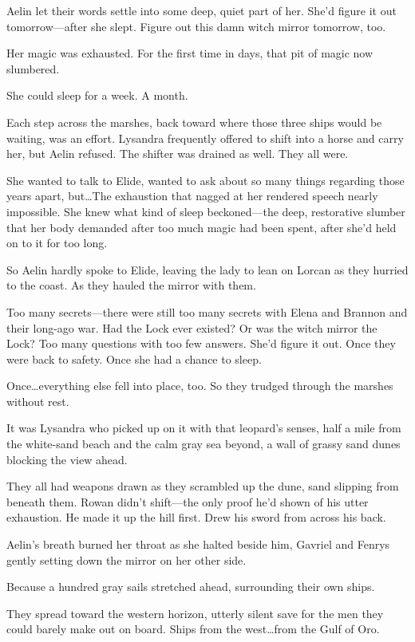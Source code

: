 Aelin let their words settle into some deep, quiet part of her.
She'd figure it out tomorrow---after she slept.
Figure out this damn witch mirror tomorrow, too.

Her magic was exhausted.
For the first time in days, that pit of magic now slumbered.

She could sleep for a week.
A month.

Each step across the marshes, back toward where those three ships would be waiting, was an effort.
Lysandra frequently offered to shift into a horse and carry her, but Aelin refused.
The shifter was drained as well.
They all were.

She wanted to talk to Elide, wanted to ask about so many things regarding those years apart, but\ldots The exhaustion that nagged at her rendered speech nearly impossible.
She knew what kind of sleep beckoned---the deep, restorative slumber that her body demanded after too much magic had been spent, after she'd held on to it for too long.

So Aelin hardly spoke to Elide, leaving the lady to lean on Lorcan as they hurried to the coast.
As they hauled the mirror with them.

Too many secrets---there were still too many secrets with Elena and Brannon and their long-ago war.
Had the Lock ever existed?
Or was the witch mirror the Lock?
Too many questions with too few answers.
She'd figure it out.
Once they were back to safety.
Once she had a chance to sleep.

Once\ldots everything else fell into place, too.
So they trudged through the marshes without rest.

It was Lysandra who picked up on it with that leopard's senses, half a mile from the white-sand beach and the calm gray sea beyond, a wall of grassy sand dunes blocking the view ahead.

They all had weapons drawn as they scrambled up the dune, sand slipping from beneath them.
Rowan didn't shift---the only proof he'd shown of his utter exhaustion.
He made it up the hill first.
Drew his sword from across his back.

Aelin's breath burned her throat as she halted beside him, Gavriel and Fenrys gently setting down the mirror on her other side.

Because a hundred gray sails stretched ahead, surrounding their own ships.

They spread toward the western horizon, utterly silent save for the men they could barely make out on board.
Ships from the west\ldots from the Gulf of Oro.

